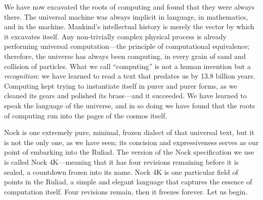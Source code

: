 We have now excavated the roots of computing and found that they were always there.  The universal machine was always implicit in language, in mathematics, and in the machine.  Mankind's intellectual history is merely the vector by which it excavates itself.  Any non-trivially complex physical process is already performing universal computation---the principle of computational equivalence; therefore, the universe has always been computing, in every grain of sand and collision of particles.  What we call ``computing'' is not a human invention but a \emph{recognition}:  we have learned to read a text that predates us by 13.8 billion years.  Computing kept trying to instantiate itself in purer and purer forms, as we cleaned its gears and polished its brass---and it succeeded.  We have learned to speak the language of the universe, and in so doing we have found that the roots of computing run into the pages of the cosmos itself.

Nock is one extremely pure, minimal, frozen dialect of that universal text, but it is not the only one, as we have seen; its concision and expressiveness serves as our point of embarking into the Ruliad.  The version of the Nock specification we use is called Nock 4K---meaning that it has four revisions remaining before it is sealed, a countdown frozen into its name.
Nock 4K is one particular field of points in the Ruliad, a simple and elegant language that captures the essence of computation itself.  Four revisions remain, then it freezes forever.  Let us begin.
